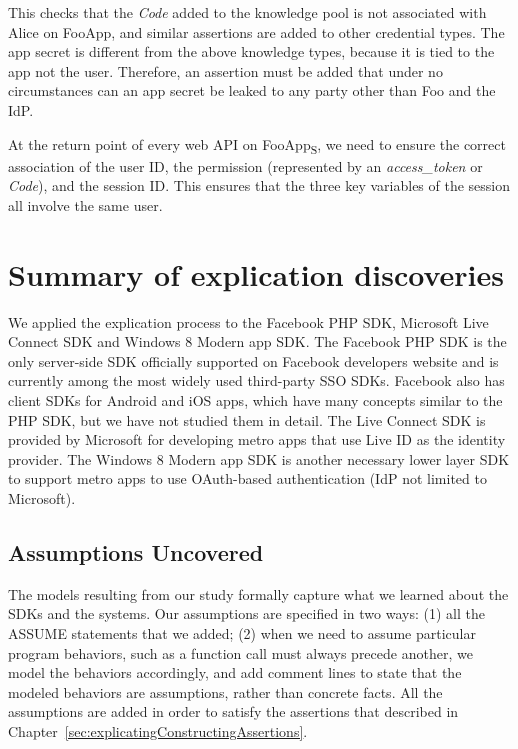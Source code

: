 
This checks that the \emph{Code} added to the knowledge pool is not associated with Alice on FooApp, and similar assertions are added to other credential types.  The app secret is different from the above knowledge types, because it is tied to the app not the user.  Therefore, an assertion must be added that under no circumstances can an app secret be leaked to any party other than Foo and the IdP.

 At the return point of every web API on FooApp\textsubscript{S}, we need to ensure the correct association of the user ID, the permission (represented by an \emph{access\_token} or \emph{Code}), and the session ID.  This ensures that the three key variables of the session all involve the same user.

\section{Summary of explication discoveries}
\label{sec:explicatingDiscoveries}

We applied the explication process to the Facebook PHP SDK, Microsoft Live Connect SDK and Windows 8 Modern app SDK.  The Facebook PHP SDK is the only server-side SDK officially supported on Facebook developers website and is currently among the most widely used third-party SSO SDKs.  Facebook also has client SDKs for Android and iOS apps, which have many concepts similar to the PHP SDK, but we have not studied them in detail.  The Live Connect SDK is provided by Microsoft for developing metro apps that use Live ID as the identity provider.  The Windows 8 Modern app SDK is another necessary lower layer SDK to support metro apps to use OAuth-based authentication (IdP not limited to Microsoft).  

\subsection{Assumptions Uncovered}

The models resulting from our study formally capture what we learned about the SDKs and the systems. Our assumptions are specified in two ways: (1) all the ASSUME statements that we added; (2) when we need to assume particular program behaviors, such as a function call must always precede another, we model the behaviors accordingly, and add comment lines to state that the modeled behaviors are assumptions, rather than concrete facts.  All the assumptions are added in order to satisfy the assertions that described in Chapter~\ref{sec:explicatingConstructingAssertions}.


